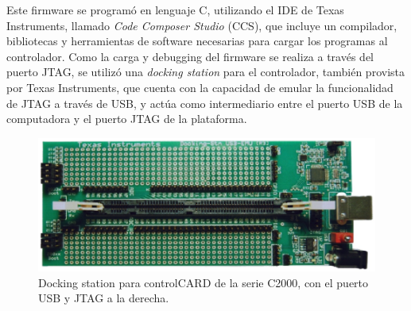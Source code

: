 Este firmware se programó en lenguaje C, utilizando el IDE de Texas Instruments, llamado \textit{Code Composer Studio} (CCS), que incluye un compilador, bibliotecas y herramientas de software necesarias para cargar los programas al controlador. Como la carga y debugging del firmware se realiza a través del puerto JTAG, se utilizó una \textit{docking station} para el controlador, también provista por Texas Instruments, que cuenta con la capacidad de emular la funcionalidad de JTAG a través de USB, y actúa como intermediario entre el puerto USB de la computadora y el puerto JTAG de la plataforma.\\ 

\begin{figure}[h]
    \centering
    \includegraphics[scale=0.25]{Imagenes/Docking Station.png}
    \caption{Docking station para controlCARD de la serie C2000, con el puerto USB y JTAG a la derecha.}
    \label{docking_station}
\end{figure}